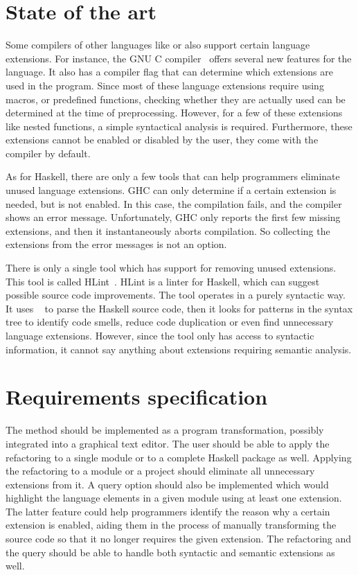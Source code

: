 \documentclass[main.tex]{subfiles}
\begin{document}
	\section{State of the art}
	
	Some compilers of other languages like  or  also support certain language extensions. For instance, the GNU C compiler~\cite{gnu-docs} offers several new features for the language. It also has a compiler flag that can determine which extensions are used in the program. Since most of these language extensions require using macros, or predefined functions, checking whether they are actually used can be determined at the time of preprocessing. However, for a few of these extensions like nested functions, a simple syntactical analysis is required. Furthermore, these extensions cannot be enabled or disabled by the user, they come with the compiler by default.
	
	As for Haskell, there are only a few tools that can help programmers eliminate unused language extensions. GHC can only determine if a certain extension is needed, but is not enabled. In this case, the compilation fails, and the compiler shows an error message. Unfortunately, GHC only reports the first few missing extensions, and then it instantaneously aborts compilation. So collecting the extensions from the error messages is not an option.
	
	There is only a single tool which has support for removing unused extensions. This tool is called HLint~\cite{hlint-bib}. HLint is a linter for Haskell, which can suggest possible source code improvements. The tool operates in a purely syntactic way. It uses ~\cite{haskell-src-exts} to parse the Haskell source code, then it looks for patterns in the syntax tree to identify code smells, reduce code duplication or even find unnecessary language extensions. However, since the tool only has access to syntactic information, it cannot say anything about extensions requiring semantic analysis.
	
	\vspace{-0.3cm}
	
	\section{Requirements specification}
	
	The method should be implemented as a program transformation, possibly integrated into a graphical text editor. The user should be able to apply the refactoring to a single module or to a complete Haskell package as well. Applying the refactoring to a module or a project should eliminate all unnecessary extensions from it. A query option should also be implemented which would highlight the language elements in a given module using at least one extension. The latter feature could help programmers identify the reason why a certain extension is enabled, aiding them in the process of manually transforming the source code so that it no longer requires the given extension. The refactoring and the query should be able to handle both syntactic and semantic extensions as well.
	
\end{document}
